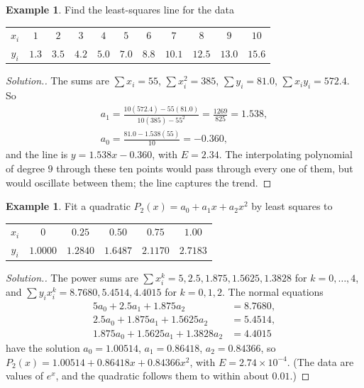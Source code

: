 \documentclass[11pt,a4paper]{article}
\numberwithin{equation}{section}
\theoremstyle{definition}
\newtheorem{exa}[thm]{Example}
\newenvironment{solution}
  {\renewcommand{\qedsymbol}{}\begin{proof}[\textit{Solution}.]}
  {\end{proof}}
\begin{document}
\begin{exa}
\label{exa:lslinear}
Find the least-squares line for the data
\begin{center}
\begin{tabular}{ccccccccccc}
\hline
$x_i$ & $1$ & $2$ & $3$ & $4$ & $5$ & $6$ & $7$ & $8$ & $9$ & $10$\\
$y_i$ & $1.3$ & $3.5$ & $4.2$ & $5.0$ & $7.0$ & $8.8$ & $10.1$ & $12.5$ & $13.0$ & $15.6$\\
\hline
\end{tabular}
\end{center}
\end{exa}

\begin{solution}
The sums are $\sum x_i = 55$, $\sum x_i^2 = 385$, $\sum y_i = 81.0$, $\sum x_iy_i = 572.4$. So
\begin{gather*}
a_1 = \frac{10(572.4)-55(81.0)}{10(385)-55^2} = \frac{1269}{825} = 1.538,\\
a_0 = \frac{81.0-1.538(55)}{10} = -0.360,
\end{gather*}
and the line is $y = 1.538x-0.360$, with $E = 2.34$. The interpolating polynomial of degree $9$ through these ten points would pass through
every one of them, but would oscillate between them; the line captures the trend.
\end{solution}

\begin{exa}
\label{exa:lsquad}
Fit a quadratic $P_2(x) = a_0+a_1x+a_2x^2$ by least squares to
\begin{center}
\begin{tabular}{cccccc}
\hline
$x_i$ & $0$ & $0.25$ & $0.50$ & $0.75$ & $1.00$\\
$y_i$ & $1.0000$ & $1.2840$ & $1.6487$ & $2.1170$ & $2.7183$\\
\hline
\end{tabular}
\end{center}
\end{exa}

\begin{solution}
The power sums are $\sum x_i^k = 5, 2.5, 1.875, 1.5625, 1.3828$ for $k = 0,\dots,4$, and $\sum y_ix_i^k = 8.7680, 5.4514, 4.4015$ for $k = 0,1,2$.
The normal equations
\begin{align*}
5a_0+2.5a_1+1.875a_2 &= 8.7680,\\
2.5a_0+1.875a_1+1.5625a_2 &= 5.4514,\\
1.875a_0+1.5625a_1+1.3828a_2 &= 4.4015
\end{align*}
have the solution $a_0 = 1.00514$, $a_1 = 0.86418$, $a_2 = 0.84366$, so $P_2(x) = 1.00514+0.86418x+0.84366x^2$, with $E = 2.74\times10^{-4}$.
(The data are values of $e^x$, and the quadratic follows them to within about $0.01$.)
\end{solution}
\end{document}
